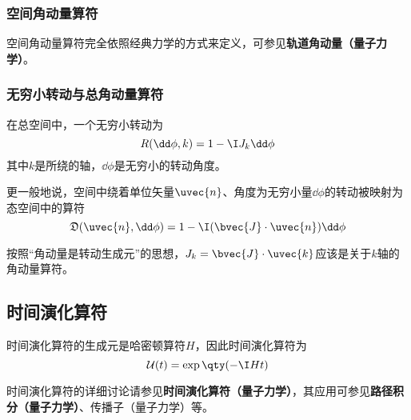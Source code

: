 \subsubsection{空间角动量算符}

空间角动量算符完全依照经典力学的方式来定义，可参见\textbf{轨道角动量（量子力学）}。


\subsubsection{无穷小转动与总角动量算符}


在总空间中，一个无穷小转动为
\begin{equation}
R(\dd \phi, k) = 1-\I J_k\dd \phi
\end{equation}
其中$k$是所绕的轴，$\dd \phi$是无穷小的转动角度。

更一般地说，空间中绕着单位矢量$\uvec{n}$、角度为无穷小量$\dd \phi$的转动被映射为态空间中的算符
\begin{equation}
\mathfrak{D}(\uvec{n}, \dd \phi) = 1-\I(\bvec{J}\cdot\uvec{n})\dd \phi
\end{equation}

按照“角动量是转动生成元”的思想，$J_k=\bvec{J}\cdot \uvec{k}$应该是关于$k$轴的角动量算符。







\subsection{时间演化算符}


时间演化算符的生成元是哈密顿算符$H$，因此时间演化算符为
\begin{equation}
\mathcal{U}(t) = \exp\qty(-\I H t)
\end{equation}

时间演化算符的详细讨论请参见\textbf{时间演化算符（量子力学）}，其应用可参见\textbf{路径积分（量子力学）}、传播子（量子力学）等。


















